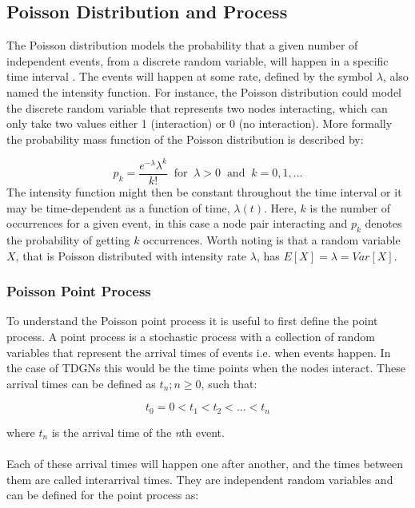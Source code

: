 \subsection{Poisson Distribution and Process}
\label{sec:Method:Poisson}
The Poisson distribution models the probability that a given number of independent events, from a discrete random variable, will happen in a specific time interval \cite{PoissonScience}. 
The events will happen at some rate, defined by the symbol $\lambda$, also named the intensity function. 
For instance, the Poisson distribution could model the discrete random variable that represents two nodes interacting, which can only take two values either 1 (interaction) or 0 (no interaction).
More formally the probability mass function of the Poisson distribution is described by:

\begin{equation}
    p_k = \frac{e^{-\lambda}\lambda^k}{k!} \;\; \text{for} \;\; \lambda > 0 \;\; \text{and} \;\; k = 0,1,\dots
\end{equation}
The intensity function might then be constant throughout the time interval or it may be time-dependent as a function of time, $\lambda(t)$.
Here, $k$ is the number of occurrences for a given event, in this case a node pair interacting and $p_k$ denotes the probability of getting $k$ occurrences.
Worth noting is that a random variable $X$, that is Poisson distributed with intensity rate $\lambda$, has $E[X] = \lambda = Var[X]$.


\subsubsection{Poisson Point Process}
\label{sec:Method:Poisson:PoissonPointProcess}
To understand the Poisson point process it is useful to first define the point process. 
A point process is a stochastic process with a collection of random variables that represent the arrival times of events i.e. when events happen. 
In the case of TDGNs this would be the time points when the nodes interact. 
These arrival times can be defined as ${t_n ; n \ge 0}$, such that:

$$
t_0 = 0 < t_1 < t_2 < ... < t_n
$$

where $t_n$ is the arrival time of the \textit{n}th event.
\\\\
Each of these arrival times will happen one after another, and the times between them are called interarrival times. 
They are independent random variables and can be defined for the point process as:

